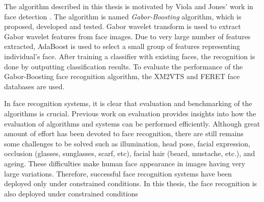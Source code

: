 The algorithm described in this thesis is motivated by Viola and Jones' work in face detection \cite{Viola2001}. The algorithm is named \textit{Gabor-Boosting} algorithm, which is proposed, developed and tested. Gabor wavelet transform is used to extract Gabor wavelet features from face images. Due to very large number of features extracted, AdaBoost is used to select a small group of features representing individual's face. After training a classifier with existing faces, the recognition is done by outputting classification results. To evaluate the performance of the Gabor-Boosting face recognition algorithm, the XM2VTS \cite{Matas2000,Messer1999} and FERET \cite{Phillips1997} face databases are used.


In face recognition systems, it is clear that evaluation and benchmarking of the algorithms is crucial. Previous work \cite{Messer1999,Phillips1997,Phillips1998,Phillips2000,Rizvi1998,Rizvi1998fg,Jain2000,Hancock2000,Gauthier2001} on evaluation provides insights into how the evaluation of algorithms and systems can be performed efficiently.  Although great amount of effort has been devoted to face recognition, there are still remains some challenges to be solved such as illumination, head pose, facial expression, occlusion (glasses, sunglasses, scarf, etc), facial hair (beard, mustache, etc.), and ageing. These difficulties make human face appearance in images having very large variations. Therefore, successful face recognition systems have been deployed only under constrained conditions. In this thesis, the face recognition is also deployed under constrained conditions
